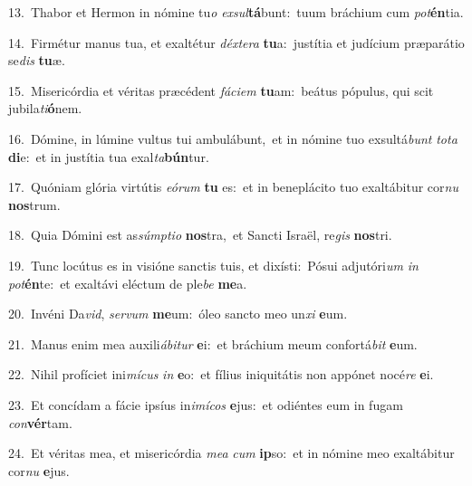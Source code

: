 {\numbfont\textcolor{\numbcolor}{13.}}~Thabor et Hermon in nómine tu\textit{o} \textit{ex}\-\textit{sul}\textbf{tá}bunt:~\star tuum bráchium cum \textit{pot}\-\textbf{én}tia.\par
{\numbfont\textcolor{\numbcolor}{14.}}~Firmétur manus tua, et exaltétur \textit{déx}\-\textit{te}\textit{ra} \textbf{tu}\-a:~\star justítia et judícium præparátio se\textit{dis} \textbf{tu}\-æ.\par
{\numbfont\textcolor{\numbcolor}{15.}}~Misericórdia et véritas præcédent \textit{fá}\-\textit{ci}\textit{em} \textbf{tu}\-am:~\star beátus pópulus, qui scit jubila\-\textit{ti}\-\textbf{ó}nem.\par
{\numbfont\textcolor{\numbcolor}{16.}}~Dómine, in lúmine vultus tui ambulábunt,~\dagger et in nómine tuo exsultá\textit{bunt} \textit{to}\-\textit{ta} \textbf{di}\-e:~\star et in justítia tua exal\-\textit{ta}\-\textbf{bún}tur.\par
{\numbfont\textcolor{\numbcolor}{17.}}~Quóniam glória virtútis \textit{e}\-\textit{ó}\textit{rum} \textbf{tu} es:~\star et in beneplácito tuo exaltábitur cor\textit{nu} \textbf{nos}\-trum.\par
{\numbfont\textcolor{\numbcolor}{18.}}~Quia Dómini est as\-\textit{súmp}\-\textit{ti}\textit{o} \textbf{nos}\-tra,~\star et Sancti Israël, re\textit{gis} \textbf{nos}\-tri.\par
{\numbfont\textcolor{\numbcolor}{19.}}~Tunc locútus es in visióne sanctis tuis, et dixísti:~\dagger Pósui adjutóri\textit{um} \textit{in} \textit{pot}\-\textbf{én}te:~\star et exaltávi eléctum de ple\textit{be} \textbf{me}\-a.\par
{\numbfont\textcolor{\numbcolor}{20.}}~Invéni Da\-\textit{vid}\-, \textit{ser}\-\textit{vum} \textbf{me}\-um:~\star óleo sancto meo un\textit{xi} \textbf{e}\-um.\par
{\numbfont\textcolor{\numbcolor}{21.}}~Manus enim mea auxili\-\textit{á}\-\textit{bi}\textit{tur} \textbf{e}\-i:~\star et bráchium meum confortá\textit{bit} \textbf{e}\-um.\par
{\numbfont\textcolor{\numbcolor}{22.}}~Nihil profíciet ini\-\textit{mí}\-\textit{cus} \textit{in} \textbf{e}\-o:~\star et fílius iniquitátis non appónet nocé\textit{re} \textbf{e}\-i.\par
{\numbfont\textcolor{\numbcolor}{23.}}~Et concídam a fácie ipsíus in\-\textit{i}\-\textit{mí}\textit{cos} \textbf{e}\-jus:~\star et odiéntes eum in fugam \textit{con}\-\textbf{vér}tam.\par
{\numbfont\textcolor{\numbcolor}{24.}}~Et véritas mea, et misericórdia \textit{me}\-\textit{a} \textit{cum} \textbf{ip}\-so:~\star et in nómine meo exaltábitur cor\textit{nu} \textbf{e}\-jus.\par
